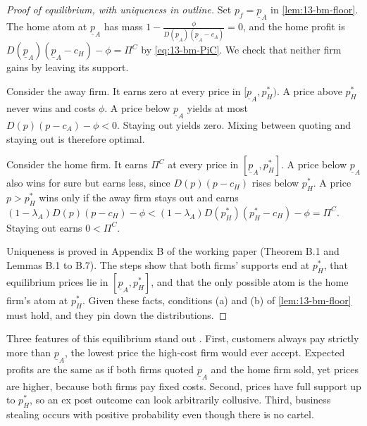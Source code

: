\begin{proof}[Proof of equilibrium, with uniqueness in outline]
Set $p_f=\underline p_A$ in \cref{lem:13-bm-floor}. The home atom at $\underline p_A$ has mass
$1-\frac{\phi}{D(\underline p_A)(\underline p_A-c_A)}=0$, and the home profit is
$D(\underline p_A)(\underline p_A-c_H)-\phi=\Pi^C$ by \eqref{eq:13-bm-PiC}. We check that neither firm gains
by leaving its support.

Consider the away firm. It earns zero at every price in $[\underline p_A,p_H^*)$. A price above $p_H^*$ never
wins and costs $\phi$. A price below $\underline p_A$ yields at most $D(p)(p-c_A)-\phi<0$. Staying out yields
zero. Mixing between quoting and staying out is therefore optimal.

Consider the home firm. It earns $\Pi^C$ at every price in $[\underline p_A,p_H^*]$. A price below
$\underline p_A$ also wins for sure but earns less, since $D(p)(p-c_H)$ rises below $p_H^*$. A price
$p>p_H^*$ wins only if the away firm stays out and earns
$(1-\lambda_A)D(p)(p-c_H)-\phi<(1-\lambda_A)D(p_H^*)(p_H^*-c_H)-\phi=\Pi^C$. Staying out earns $0<\Pi^C$.

Uniqueness is proved in Appendix B of the working paper (Theorem B.1 and Lemmas B.1 to B.7). The steps show
that both firms' supports end at $p_H^*$, that equilibrium prices lie in $[\underline p_A,p_H^*]$, and that
the only possible atom is the home firm's atom at $p_H^*$. Given these facts, conditions (a) and (b) of
\cref{lem:13-bm-floor} must hold, and they pin down the distributions.
\end{proof}

Three features of this equilibrium stand out \citep[p.~9]{BernheimMadsen2017}. First, customers always pay
strictly more than $\underline p_A$, the lowest price the high-cost firm would ever accept. Expected profits
are the same as if both firms quoted $\underline p_A$ and the home firm sold, yet prices are higher, because
both firms pay fixed costs. Second, prices have full support up to $p_H^*$, so an ex post outcome can look
arbitrarily collusive. Third, business stealing occurs with positive probability even though there is no
cartel.

